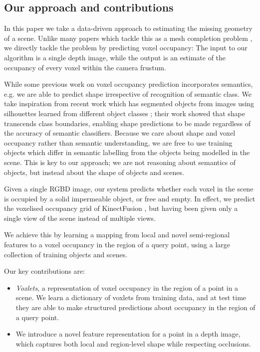 \documentclass[10pt,twocolumn,letterpaper]{article}
\makeatletter
\renewcommand*{\eg}{e.g.\@\xspace}
\makeatother
\begin{document}
\subsection{Our approach and contributions}

In this paper we take a data-driven approach to estimating the missing geometry of a scene.
Unlike many papers which tackle this as a mesh completion problem \cite{schnabel-eurographics-2009, ju-cst-2009}, we directly tackle the problem by predicting voxel occupancy:
The input to our algorithm is a single depth image, while the output is an estimate of the occupancy of every voxel within the camera frustum.

While some previous work on voxel occupancy prediction incorporates semantics, \eg \cite{kim-iccv-2013, shen-tog-2012, cocias-cgvcv-2013} we are able to predict shape irrespective of recognition of semantic class.
We take inspiration from recent work which has segmented objects from images using silhouettes learned from different object classes \cite{kim-eccv-2012};
their work showed that shape transcends class boundaries, enabling shape predictions to be made regardless of the accuracy of semantic classifiers.
Because we care about shape and voxel occupancy rather than semantic understanding, we are free to use training objects which differ in semantic labelling from the objects being modelled in the scene.
This is key to our approach; we are not reasoning about semantics of objects, but instead about the shape of objects and scenes.

Given a single RGBD image, our system predicts whether each voxel in the scene is occupied by a solid impermeable object, or free and empty. 
In effect, we predict the voxelised occupancy grid of KinectFusion \cite{izadi-uist-2011}, but having been given only a single view of the scene instead of multiple views.

We achieve this by learning a mapping from local and novel semi-regional features to a voxel occupancy in the region of a query point, using a large collection of training objects and scenes.

Our key contributions are:

\begin{itemize}
\item \emph{Voxlets}, a representation of voxel occupancy in the region of a point in a scene. We learn a dictionary of voxlets from training data, and at test time they are able to make structured predictions about occupancy in the region of a query point.
\item We introduce a novel feature representation for a point in a depth image, which captures both local and region-level shape while respecting occlusions.
\end{itemize}
\end{document}
